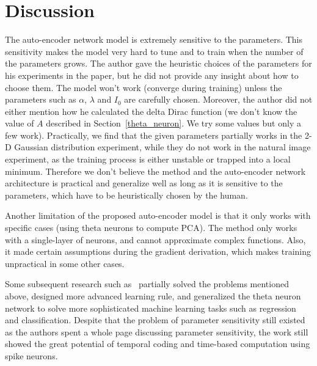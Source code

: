\section{Discussion}
\label{discussion}

The auto-encoder network model is extremely sensitive to the parameters.
This sensitivity makes the model very hard to tune and to train when the number of the parameters grows.
The author gave the heuristic choices of the parameters for his experiments in the paper, 
but he did not provide any insight about how to choose them. 
The model won't work (converge during training) unless the parameters such as 
$\alpha$, $\lambda$ and $I_0$ are carefully chosen.
Moreover, the author did not either mention how he calculated the delta Dirac function 
(we don't know the value of $A$ described in Section~\ref{theta_neuron}. We try some values but only a few work).
Practically, we find that the given parameters partially works in the 2-D Gaussian distribution experiment, 
while they do not work in the natural image experiment,
as the training process is either unstable or trapped into a local minimum. 
Therefore we don't believe the method and the auto-encoder network architecture is practical and generalize well
as long as it is sensitive to the parameters, which have to be heuristically chosen by the human.

Another limitation of the proposed auto-encoder model is that it only works with specific cases
(using theta neurons to compute PCA).
The method only works with a single-layer of neurons, and cannot approximate complex functions.
Also, it made certain assumptions during the gradient derivation, which makes training unpractical in some other cases.

Some subsequent research such as~\cite{mckennoch2009spike} partially solved the problems mentioned above,
designed more advanced learning rule, 
and generalized the theta neuron network to solve more sophisticated machine learning tasks such as regression and classification.
Despite that the problem of parameter sensitivity still existed as the authors spent a whole page 
discussing parameter sensitivity, the work still showed the great potential of temporal coding and time-based computation using spike neurons.
